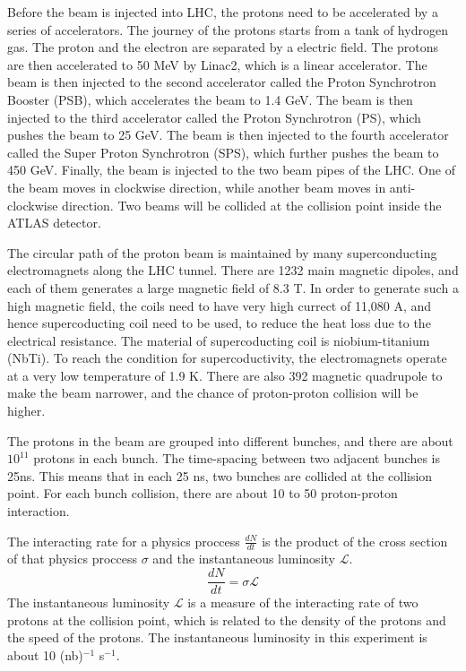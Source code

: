 Before the beam is injected into LHC, the protons need to be accelerated by a series of accelerators.
The journey of the protons starts from a tank of hydrogen gas.
The proton and the electron are separated by a electric field.
The protons are then accelerated to 50 MeV by Linac2, which is a linear accelerator.
The beam is then injected to the second accelerator called the Proton Synchrotron Booster (PSB), which accelerates the beam to 1.4 GeV.
The beam is then injected to the third accelerator called the Proton Synchrotron (PS), which pushes the beam to 25 GeV.
The beam is then injected to the fourth accelerator called the Super Proton Synchrotron (SPS), which further pushes the beam to 450 GeV.
Finally, the beam is injected to the two beam pipes of the LHC.
One of the beam moves in clockwise direction, while another beam moves in anti-clockwise direction.
Two beams will be collided at the collision point inside the ATLAS detector.
\cite{accelerator}

The circular path of the proton beam is maintained by many superconducting electromagnets along the LHC tunnel.
There are 1232 main magnetic dipoles, and each of them generates a large magnetic field of 8.3 T.
In order to generate such a high magnetic field, the coils need to have very high currect of 11,080 A, and hence supercoducting coil need to be used, to reduce the heat loss due to the electrical resistance.
The material of supercoducting coil is niobium-titanium (NbTi).
To reach the condition for supercoductivity, the electromagnets operate at a very low temperature of 1.9 K.
There are also 392 magnetic quadrupole to make the beam narrower, and the chance of proton-proton collision will be higher.
\cite{supermagnet,cryogenics}

The protons in the beam are grouped into different bunches, and there are about $10^{11}$ protons in each bunch.
The time-spacing between two adjacent bunches is 25ns.
This means that in each 25 ns, two bunches are collided at the collision point.
For each bunch collision, there are about 10 to 50 proton-proton interaction.

The interacting rate for a physics proccess $\frac{dN}{dt}$ is the product of the cross section of that physics proccess $\sigma$ and the instantaneous luminosity $\mathcal{L}$.
\begin{equation}
\frac{dN}{dt} = \sigma \mathcal{L}
\end{equation}
The instantaneous luminosity $\mathcal{L}$ is a measure of the interacting rate of two protons at the collision point, which is related to the density of the protons and the speed of the protons.
The instantaneous luminosity in this experiment is about 10 (nb)$^{-1}$ s$^{-1}$.

